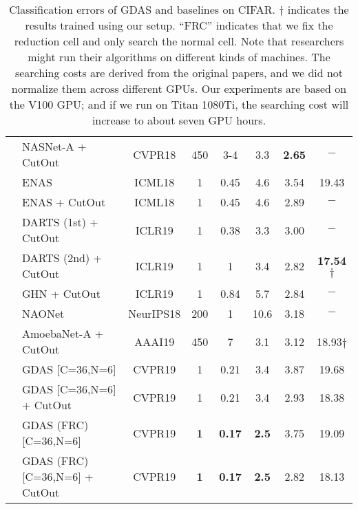 \documentclass[10pt,twocolumn,letterpaper]{article}
\begin{document}
\begin{table*}[t!]
\begin{tabular}{| c | l | c | c | c | c | c | c |}
    &  NASNet-A + CutOut~\cite{Zoph_2018_CVPR}          & CVPR18  & 450  & 3-4         & 3.3  & \textbf{2.65} & $-$ \\
    &  ENAS~\cite{pmlr-v80-pham18a}                     & ICML18  & 1    & 0.45        & 4.6  & 3.54          &  19.43 \\
    &  ENAS + CutOut~\cite{pmlr-v80-pham18a}            & ICML18  & 1    & 0.45        & 4.6  & 2.89          &  $-$ \\
&  DARTS (1st) + CutOut~\cite{liu2019darts}   & ICLR19  & 1    & 0.38   & 3.3   & 3.00          & $-$ \\
    &  DARTS (2nd) + CutOut~\cite{liu2019darts}   & ICLR19  & 1    & 1           & 3.4  & 2.82          & \textbf{17.54}$\dagger$ \\
&  GHN + CutOut~\cite{zhang2019graph}               & ICLR19  & 1    & 0.84        & 5.7  & 2.84          & $-$ \\
    &  NAONet~\cite{luo2018neural}                      & NeurIPS18  & 200  & 1           & 10.6 & 3.18          & $-$ \\
    &  AmoebaNet-A + CutOut~\cite{real2019regularized}  & AAAI19 & 450  & 7           & 3.1  & 3.12          & 18.93$\dagger$ \\
    \cline{2-8}
    & GDAS [C=36,N=6]                                   & CVPR19 & 1    & 0.21        & 3.4  & 3.87          & 19.68 \\
    & GDAS [C=36,N=6] + CutOut                          & CVPR19 & 1    & 0.21        & 3.4  & 2.93          & 18.38 \\
    & GDAS (FRC) [C=36,N=6]                             & CVPR19 & \textbf{1} & \textbf{0.17} & \textbf{2.5}  &  3.75   & 19.09 \\
    & GDAS (FRC) [C=36,N=6] + CutOut                    & CVPR19 & \textbf{1} & \textbf{0.17} & \textbf{2.5}  &  2.82   & 18.13 \\
    \hline
    \hline
\end{tabular}
\vspace{2mm}
\caption{
Classification errors of GDAS and baselines on CIFAR.
$\dagger$ indicates the results trained using our setup.
``FRC'' indicates that we fix the reduction cell and only search the normal cell.
Note that researchers might run their algorithms on different kinds of machines.
The searching costs are derived from the original papers, and we did not normalize them across different GPUs. Our experiments are based on the V100 GPU; and if we run on Titan 1080Ti, the searching cost will increase to about seven GPU hours.
}
\vspace{-2mm}
\label{table:CIFAR}
\end{table*}
\end{document}
